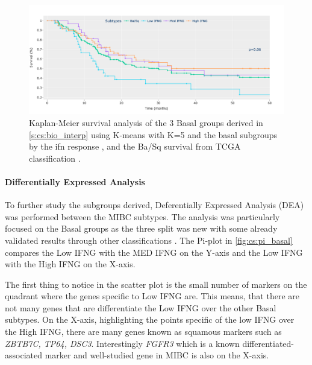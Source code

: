 \begin{figure}[!htb]    
    \centering
    \includegraphics[width=1.0\textwidth,keepaspectratio]{Sections/ClusteringAnalysis/Resources/discussion/survival_basal.png}
    \caption{Kaplan-Meier survival analysis of the 3 Basal groups derived in \cref{s:cs:bio_interp} using K-means with K=5 and the basal subgroups by the \acrshort{ifn} response \citet{Baker2022-bj}, and the Ba/Sq survival from TCGA classification \citet{Robertson2017-mg}.}
    \label{fig:cs:basal_survival}
\end{figure}

\paragraph*{Differentially Expressed Analysis}

To further study the subgroups derived, Deferentially Expressed Analysis (DEA) was performed between the MIBC subtypes. The analysis was particularly focused on the Basal groups as the three split was new with some already validated results through other classifications \citet{Baker2022-bj,Marzouka2018-ge}. The Pi-plot in \cref{fig:cs:pi_basal} compares the Low IFNG with the MED IFNG on the Y-axis and the Low IFNG with the High IFNG on the X-axis. 

The first thing to notice in the scatter plot is the small number of markers on the quadrant where the genes specific to Low IFNG are. This means, that there are not many genes that are differentiate the Low IFNG over the other Basal subtypes. On the X-axis, highlighting the points specific of the low IFNG over the High IFNG, there are many genes known as squamous markers such as \textit{ZBTB7C, TP64, DSC3}. Interestingly \textit{FGFR3} which is a known differentiated-associated marker and well-studied gene in MIBC is also on the X-axis. 

